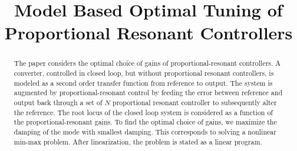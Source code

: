 \documentclass[conference,10pt]{IEEEtran}
\begin{document}
%


\title{Model Based Optimal Tuning of Proportional Resonant Controllers}



\author{
\IEEEauthorblockA{  }
\IEEEauthorblockE{}}


%



\maketitle


\begin{abstract}
The paper considers the optimal choice of gains of proportional-resonant controllers. A converter, controlled in closed loop, but without proportional resonant controllers, is modeled as a second order transfer function from reference to output. The system is augmented by proportional-resonant control by feeding the error between reference and output back through a set of $N$ proportional resonant controller to subsequently alter the reference. The root locus of the closed loop system is considered as a function of the proportional-resonant gains. To find the optimal choice of gains, we maximize the damping of the mode with smallest damping. This corresponds to solving a nonlinear min-max problem. After linearization, the problem is stated as a linear program.
\end{abstract}
\end{document}
